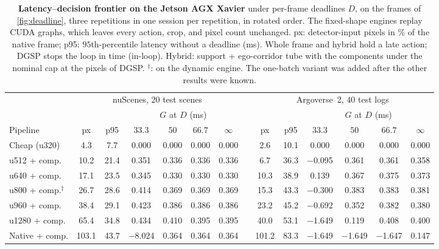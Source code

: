 \documentclass[10pt,letterpaper]{article}
\newcommand{\method}{DGSP\xspace}
\newcommand{\G}{G}
\theoremstyle{remark}
\theoremstyle{plain}
\theoremstyle{definition}
\begin{document}
\begin{table}[!htbp]
\centering
\caption{\textbf{Latency--decision frontier on the Jetson AGX Xavier} under per-frame deadlines $D$, on the frames of \cref{fig:deadline}, three repetitions in one session per repetition, in rotated order. The fixed-shape engines replay CUDA graphs, which leaves every action, crop, and pixel count unchanged. px: detector-input pixels in \% of the native frame; p95: $95$th-percentile latency without a deadline (ms). Whole frame and hybrid hold a late action; \method stops the loop in time (in-loop). Hybrid: support + ego-corridor tube with the components under the nominal cap at the pixels of \method. $^{\ddagger}$: on the dynamic engine. The one-batch variant was added after the other results were known.}
\label{tab:frontier}
\small
\setlength{\tabcolsep}{2.6pt}
\begin{tabular}{@{}lccccccccccccc@{}}
\toprule
 & \multicolumn{6}{c}{nuScenes, $20$ test scenes} & & \multicolumn{6}{c}{Argoverse~2, $40$ test logs} \\
\cmidrule(lr){2-7}\cmidrule(l){9-14}
 & & & \multicolumn{4}{c}{$\G$ at $D$ (ms)} & & & & \multicolumn{4}{c}{$\G$ at $D$ (ms)} \\
\cmidrule(lr){4-7}\cmidrule(l){11-14}
Pipeline & px & p95 & $33.3$ & $50$ & $66.7$ & $\infty$ & & px & p95 & $33.3$ & $50$ & $66.7$ & $\infty$ \\
\midrule
Cheap (u320) & 4.3 & 7.7 & 0.000 & 0.000 & 0.000 & 0.000 & & 2.6 & 10.1 & 0.000 & 0.000 & 0.000 & 0.000 \\
u512 + comp. & 10.2 & 21.4 & 0.351 & 0.336 & 0.336 & 0.336 & & 6.7 & 36.3 & $-$0.095 & 0.361 & 0.361 & 0.358 \\
u640 + comp. & 17.1 & 23.5 & 0.345 & 0.330 & 0.330 & 0.330 & & 10.3 & 38.9 & 0.139 & 0.367 & 0.375 & 0.373 \\
u800 + comp.$^{\ddagger}$ & 26.7 & 28.6 & 0.414 & 0.369 & 0.369 & 0.369 & & 15.3 & 43.3 & $-$0.300 & 0.383 & 0.383 & 0.381 \\
u960 + comp. & 38.4 & 29.1 & 0.423 & 0.386 & 0.386 & 0.386 & & 23.2 & 45.2 & $-$0.692 & 0.352 & 0.382 & 0.380 \\
u1280 + comp. & 65.4 & 34.8 & 0.434 & 0.410 & 0.395 & 0.395 & & 40.0 & 53.1 & $-$1.649 & 0.119 & 0.408 & 0.400 \\
Native + comp. & 103.1 & 43.7 & $-$8.024 & 0.364 & 0.364 & 0.364 & & 101.2 & 83.3 & $-$1.649 & $-$1.649 & $-$1.647 & 0.147 \\

\end{tabular}
\end{table}
\end{document}
